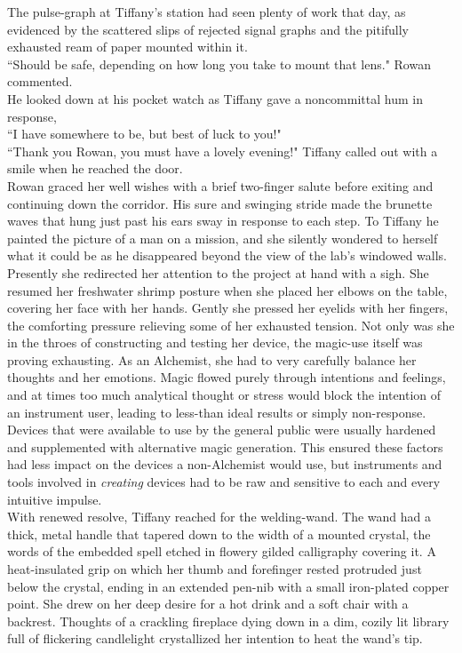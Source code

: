 The pulse-graph at Tiffany's station had seen plenty of work that day, as evidenced by the scattered slips of rejected signal graphs and the pitifully exhausted ream of paper mounted within it.\\
``Should be safe, depending on how long you take to mount that lens." Rowan commented.\\
He looked down at his pocket watch as Tiffany gave a noncommittal hum in response,\\
``I have somewhere to be, but best of luck to you!"\\
``Thank you Rowan, you must have a lovely evening!" Tiffany called out with a smile when he reached the door.\\

Rowan graced her well wishes with a brief two-finger salute before exiting and continuing down the corridor.
His sure and swinging stride made the brunette waves that hung just past his ears sway in response to each step. 
To Tiffany he painted the picture of a man on a mission, and she silently wondered to herself what it could be as he disappeared beyond the view of the lab's windowed walls.\\

Presently she redirected her attention to the project at hand with a sigh.
She resumed her freshwater shrimp posture when she placed her elbows on the table, covering her face with her hands.
Gently she pressed her eyelids with her fingers, the comforting pressure relieving some of her exhausted tension.
Not only was she in the throes of constructing and testing her device, the magic-use itself was proving exhausting.
As an Alchemist, she had to very carefully balance her thoughts and her emotions.
Magic flowed purely through intentions and feelings, and at times too much analytical thought or stress would block the intention of an instrument user, leading to less-than ideal results or simply non-response.
Devices that were available to use by the general public were usually hardened and supplemented with alternative magic generation. 
This ensured these factors had less impact on the devices a non-Alchemist would use, but instruments and tools involved in \textit{creating} devices had to be raw and sensitive to each and every intuitive impulse.\\

With renewed resolve, Tiffany reached for the welding-wand.
The wand had a thick, metal handle that tapered down to the width of a mounted crystal, the words of the embedded spell etched in flowery gilded calligraphy covering it.
A heat-insulated grip on which her thumb and forefinger rested protruded just below the crystal, ending in an extended pen-nib with a small iron-plated copper point.
She drew on her deep desire for a hot drink and a soft chair with a backrest.
Thoughts of a crackling fireplace dying down in a dim, cozily lit library full of flickering candlelight crystallized her intention to heat the wand's tip.\\

